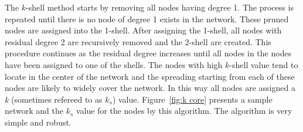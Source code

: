 \documentclass[sigconf]{acmart}
\begin{document}
\begin{itemize}
	The $k$-shell method starts by removing all nodes having degree 1. The process is repeated until there is no node of degree 1 exists in the network. These pruned nodes are assigned into the 1-shell. After assigning the 1-shell, all nodes with residual degree 2 are recursively removed and the 2-shell are created. This procedure continues as the residual degree increases until all nodes in the nodes have been assigned to one of the shells. The nodes with high $k$-shell value tend to locate in the center of the network and the spreading starting from each of these nodes are likely to widely cover the network. In this way all nodes are assigned a \emph{k} (sometimes refereed to as $k_s$) value. Figure~\ref{fig:k core} presents a sample network and the $k_s$ value for the nodes by this algorithm. The algorithm is very simple and robust. 
	

\end{itemize}
\end{document}
